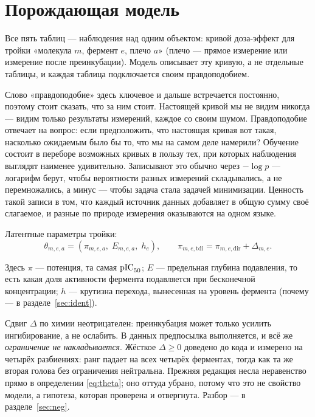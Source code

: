 \section{Порождающая модель}
\label{sec:gen}

Все пять таблиц --- наблюдения над одним объектом: кривой доза-эффект для тройки «молекула $m$,
фермент $e$, плечо $a$» (плечо --- прямое измерение или измерение после преинкубации). Модель
описывает эту кривую, а не отдельные таблицы, и каждая таблица подключается своим
правдоподобием.

Слово «правдоподобие» здесь ключевое и дальше встречается постоянно, поэтому стоит сказать,
что за ним стоит. Настоящей кривой мы не видим никогда --- видим только результаты измерений,
каждое со своим шумом. Правдоподобие отвечает на вопрос: если предположить, что настоящая
кривая вот такая, насколько ожидаемым было бы то, что мы на самом деле намерили? Обучение
состоит в переборе возможных кривых в пользу тех, при которых наблюдения выглядят наименее
удивительно. Записывают это обычно через $-\log p$ --- логарифм берут, чтобы вероятности
разных измерений складывались, а не перемножались, а минус --- чтобы задача стала задачей
минимизации. Ценность такой записи в том, что каждый источник данных добавляет в общую сумму
своё слагаемое, и разные по природе измерения оказываются на одном языке.

Латентные параметры тройки:
\begin{equation}
\theta_{m,e,a} = (\pi_{m,e,a},\; E_{m,e,a},\; h_e),
\qquad
\pi_{m,e,\text{tdi}} = \pi_{m,e,\text{dir}} + \Delta_{m,e} .
\label{eq:theta}
\end{equation}

Здесь $\pi$ --- потенция, та самая $\mathrm{pIC}_{50}$; $E$ --- предельная глубина подавления, то есть какая доля
активности фермента подавляется при бесконечной концентрации; $h$ --- крутизна перехода, вынесенная
на уровень фермента (почему --- в разделе~\ref{sec:ident}).

Сдвиг $\Delta$ по химии неотрицателен: преинкубация может только усилить ингибирование, а не
ослабить. В данных предпосылка выполняется, и всё же \emph{ограничение не накладывается}. Жёсткое
$\Delta \ge 0$ доведено до кода и измерено на четырёх разбиениях: ранг падает на всех четырёх
ферментах, тогда как та же вторая голова без ограничения нейтральна. Прежняя редакция несла
неравенство прямо в определении \eqref{eq:theta}; оно оттуда убрано, потому что это не свойство
модели, а гипотеза, которая проверена и отвергнута. Разбор --- в разделе~\ref{sec:neg}.

